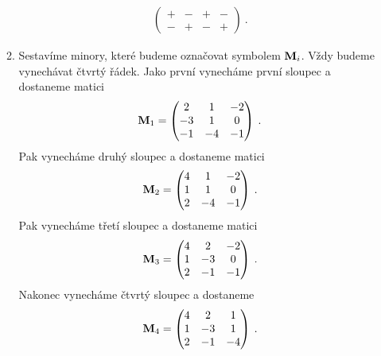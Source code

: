 \begin{itemize}
\begin{example}
\begin{enumerate}
\begin{align}
\begin{pmatrix}
                    + & - & + & - \\
                    \boldsymbol{-} & \boldsymbol{+} & \boldsymbol{-} & \boldsymbol{+}
                \end{pmatrix} \:.
            \end{align}
            \item Sestavíme minory, které budeme označovat symbolem $\mathbf{M}_i$. Vždy budeme vynechávat čtvrtý řádek. Jako první vynecháme první sloupec a dostaneme matici
            \begin{align}
                \mathbf{M}_1 = \left(\begin{matrix}
                    2 & 1 & -2 \\
                    -3 & 1 & 0 \\
                    -1 & -4 & -1
                    \end{matrix}\right) \:.
            \end{align}
            Pak vynecháme druhý sloupec a dostaneme matici
            \begin{align}
                \mathbf{M}_2 = \left(\begin{matrix}
                    4 & 1 & -2 \\
                    1 & 1 & 0 \\
                    2 & -4 & -1
                    \end{matrix}\right) \:.
            \end{align}
            Pak vynecháme třetí sloupec a dostaneme matici
            \begin{align}
                \mathbf{M}_3 = \left(\begin{matrix}
                4 & 2 & -2 \\
                1 & -3 & 0 \\
                2 & -1 & -1
                \end{matrix}\right) \:.
            \end{align}
            Nakonec vynecháme čtvrtý sloupec a dostaneme
            \begin{align}
                \mathbf{M}_4 = \left(\begin{matrix}
                    4 & 2 & 1 \\
                    1 & -3 & 1  \\
                    2 & -1 & -4
                \end{matrix}\right) \:.
            \end{align}


\end{enumerate}
\end{example}
\end{itemize}
